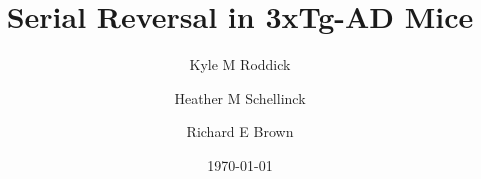 \usepackage{authblk}

\renewcommand\Affilfont{\itshape\small}

\title{Serial Reversal in 3xTg-AD Mice}

\author[1]{Kyle M Roddick}
\author[1]{Heather M Schellinck}
\author[1]{Richard E Brown}

\date{\today}
